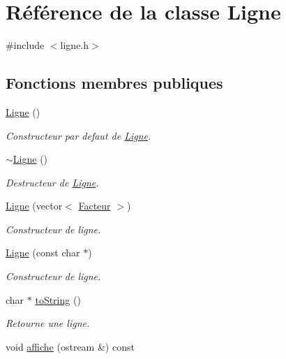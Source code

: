 \hypertarget{classLigne}{
\section{Référence de la classe Ligne}
\label{classLigne}
}


{\ttfamily \#include $<$ligne.h$>$}

\subsection*{Fonctions membres publiques}
\begin{DoxyCompactItemize}
\item 
\hypertarget{classLigne_aa8953c4b617add4054ed9f73b36995b7}{
\hyperlink{classLigne_aa8953c4b617add4054ed9f73b36995b7}{Ligne} ()}
\label{classLigne_aa8953c4b617add4054ed9f73b36995b7}

\begin{DoxyCompactList}\small\item\em Constructeur par defaut de \hyperlink{classLigne}{Ligne}. \item\end{DoxyCompactList}\item 
\hypertarget{classLigne_a7496e90cf05bab745e3645919d33c811}{
\hyperlink{classLigne_a7496e90cf05bab745e3645919d33c811}{$\sim$Ligne} ()}
\label{classLigne_a7496e90cf05bab745e3645919d33c811}

\begin{DoxyCompactList}\small\item\em Destructeur de \hyperlink{classLigne}{Ligne}. \item\end{DoxyCompactList}\item 
\hyperlink{classLigne_a7065d8ee1a96e034b1c6ccb2381ef767}{Ligne} (vector$<$ \hyperlink{classFacteur}{Facteur} $>$)
\begin{DoxyCompactList}\small\item\em Constructeur de ligne. \item\end{DoxyCompactList}\item 
\hypertarget{classLigne_a1ad090c82572852d6805c7d880ccbeb4}{
\hyperlink{classLigne_a1ad090c82572852d6805c7d880ccbeb4}{Ligne} (const char $\ast$)}
\label{classLigne_a1ad090c82572852d6805c7d880ccbeb4}

\begin{DoxyCompactList}\small\item\em Constructeur de ligne. \item\end{DoxyCompactList}\item 
char $\ast$ \hyperlink{classLigne_ac50b7665f6259fd0eb8f00dca6142bba}{toString} ()
\begin{DoxyCompactList}\small\item\em Retourne une ligne. \item\end{DoxyCompactList}\item 
\hypertarget{classLigne_a283b2e758aec620553e4df9ed9e20fd2}{
void \hyperlink{classLigne_a283b2e758aec620553e4df9ed9e20fd2}{affiche} (ostream \&) const }
\label{classLigne_a283b2e758aec620553e4df9ed9e20fd2}


\end{DoxyCompactItemize}
